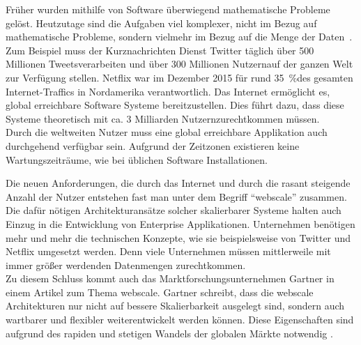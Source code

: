 Früher wurden mithilfe von Software überwiegend mathematische Probleme gelöst. Heutzutage sind die Aufgaben viel komplexer, nicht im Bezug auf mathematische Probleme, sondern vielmehr im Bezug auf die Menge der Daten~\cite[S.~18]{kuhn_reactive_2015}. Zum Beispiel muss der Kurznachrichten Dienst Twitter täglich über 500 Millionen Tweets\footnotemark[1] verarbeiten und über 300 Millionen Nutzern\footnotemark[2] auf der ganzen Welt zur Verfügung stellen. Netflix war im Dezember 2015 für rund 35~\%\footnotemark[3] des gesamten Internet-Traffics in Nordamerika verantwortlich. Das Internet ermöglicht es, global erreichbare Software Systeme bereitzustellen. Dies führt dazu, dass diese Systeme theoretisch mit ca. 3 Milliarden Nutzern\footnotemark[4] zurechtkommen müssen.\\
Durch die weltweiten Nutzer muss eine global erreichbare Applikation auch durchgehend verfügbar sein. Aufgrund der Zeitzonen existieren keine Wartungszeiträume, wie bei üblichen Software Installationen.


\pagebreak

Die neuen Anforderungen, die durch das Internet und durch die rasant steigende Anzahl der Nutzer entstehen fast man unter dem Begriff \enquote{\gls{webscale}} zusammen. Die dafür nötigen Architekturansätze solcher skalierbarer Systeme halten auch Einzug in die Entwicklung von Enterprise Applikationen. Unternehmen benötigen mehr und mehr die technischen Konzepte, wie sie beispielsweise von Twitter und Netflix umgesetzt werden. Denn viele Unternehmen müssen mittlerweile mit immer größer werdenden Datenmengen zurechtkommen.\\
Zu diesem Schluss kommt auch das Marktforschungsunternehmen Gartner in einem Artikel zum Thema \gls{webscale}. Gartner schreibt, dass die \gls{webscale} Architekturen nur nicht auf bessere Skalierbarkeit ausgelegt sind, sondern auch wartbarer und flexibler weiterentwickelt werden können. Diese Eigenschaften sind aufgrund des rapiden und stetigen Wandels der globalen Märkte notwendig \cite{van_der_meulen_gartner_2014}.\\

